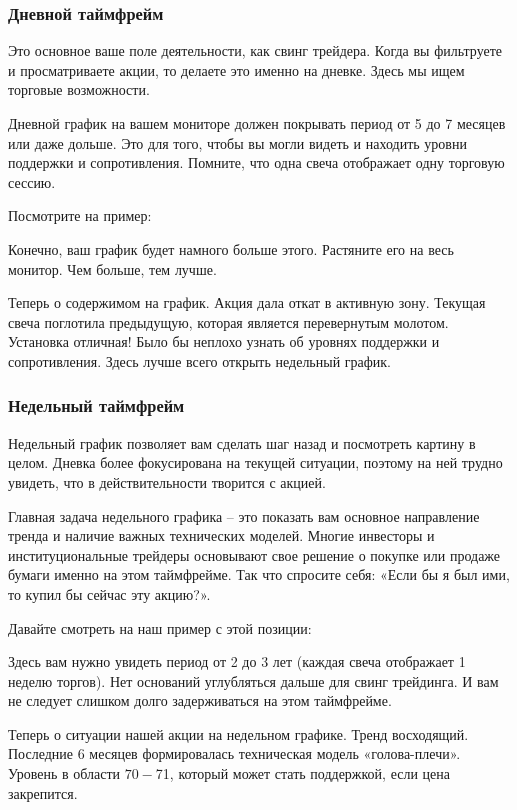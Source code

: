 \documentclass{book}
\begin{document}
\subsubsection{Дневной таймфрейм}

Это основное ваше поле деятельности, как свинг трейдера. Когда вы фильтруете и просматриваете акции, то делаете это именно на дневке. Здесь мы ищем торговые возможности.

Дневной график на вашем мониторе должен покрывать период от 5 до 7 месяцев или даже дольше. Это для того, чтобы вы могли видеть и находить уровни поддержки и сопротивления. Помните, что одна свеча отображает одну торговую сессию.

Посмотрите на пример:

Конечно, ваш график будет намного больше этого. Растяните его на весь монитор. Чем больше, тем лучше.

Теперь о содержимом на график. Акция дала откат в активную
зону. Текущая свеча поглотила предыдущую, которая является
перевернутым молотом. Установка отличная! Было бы неплохо узнать об
уровнях поддержки и сопротивления. Здесь лучше всего открыть недельный
график.

\subsubsection{Недельный таймфрейм}

Недельный график позволяет вам сделать шаг назад и посмотреть картину в целом. Дневка более фокусирована на текущей ситуации, поэтому на ней трудно увидеть, что в действительности творится с акцией.

Главная задача недельного графика – это показать вам основное направление тренда и наличие важных технических моделей. Многие инвесторы и институциональные трейдеры основывают свое решение о покупке или продаже бумаги именно на этом таймфрейме. Так что спросите себя: «Если бы я был ими, то купил бы сейчас эту акцию?».

Давайте смотреть на наш пример с этой позиции:

Здесь вам нужно увидеть период от 2 до 3 лет (каждая свеча отображает 1 неделю торгов). Нет оснований углубляться дальше для свинг трейдинга. И вам не следует слишком долго задерживаться на этом таймфрейме.

Теперь о ситуации нашей акции на недельном графике. Тренд
восходящий. Последние 6 месяцев формировалась техническая модель
«голова-плечи». Уровень в области $70-$71, который может стать
поддержкой, если цена закрепится.
\end{document}
